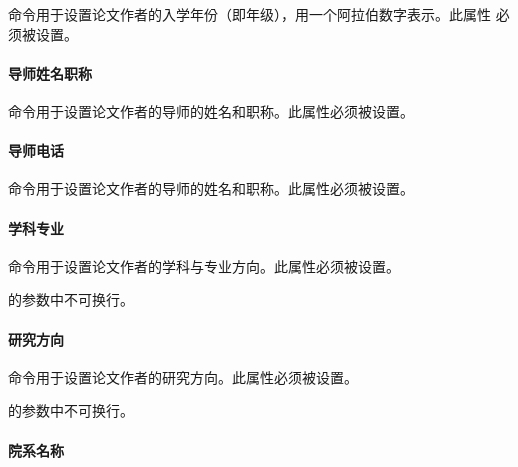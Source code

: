 命令用于设置论文作者的入学年份（即年级），用一个阿拉伯数字表示。此属性
必须被设置。
\begin{tex}
\end{tex}

\paragraph{导师姓名职称}

命令用于设置论文作者的导师的姓名和职称。此属性必须被设置。
\begin{tex}
\end{tex}

\paragraph{导师电话}

命令用于设置论文作者的导师的姓名和职称。此属性必须被设置。
\begin{tex}
\end{tex}

\paragraph{学科专业}

命令用于设置论文作者的学科与专业方向。此属性必须被设置。
\begin{tex}
\end{tex}
\begin{note}
的参数中不可换行。
\end{note}

\paragraph{研究方向}

命令用于设置论文作者的研究方向。此属性必须被设置。
\begin{tex}
\end{tex}
\begin{note}
的参数中不可换行。
\end{note}

\paragraph{院系名称}

